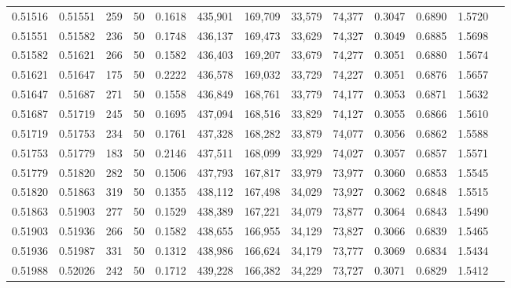 \begin{tabular}{rrrrrrrrrrrrr}
0.51516 & 0.51551 &   259 &  50 &                                     0.1618 & 435,901 & 169,709 &  33,579 &  74,377 & 0.3047 & 0.6890 & 1.5720 \\
0.51551 & 0.51582 &   236 &  50 &                                     0.1748 & 436,137 & 169,473 &  33,629 &  74,327 & 0.3049 & 0.6885 & 1.5698 \\
0.51582 & 0.51621 &   266 &  50 &                                     0.1582 & 436,403 & 169,207 &  33,679 &  74,277 & 0.3051 & 0.6880 & 1.5674 \\
0.51621 & 0.51647 &   175 &  50 &                                     0.2222 & 436,578 & 169,032 &  33,729 &  74,227 & 0.3051 & 0.6876 & 1.5657 \\
0.51647 & 0.51687 &   271 &  50 &                                     0.1558 & 436,849 & 168,761 &  33,779 &  74,177 & 0.3053 & 0.6871 & 1.5632 \\
0.51687 & 0.51719 &   245 &  50 &                                     0.1695 & 437,094 & 168,516 &  33,829 &  74,127 & 0.3055 & 0.6866 & 1.5610 \\
0.51719 & 0.51753 &   234 &  50 &                                     0.1761 & 437,328 & 168,282 &  33,879 &  74,077 & 0.3056 & 0.6862 & 1.5588 \\
0.51753 & 0.51779 &   183 &  50 &                                     0.2146 & 437,511 & 168,099 &  33,929 &  74,027 & 0.3057 & 0.6857 & 1.5571 \\
0.51779 & 0.51820 &   282 &  50 &                                     0.1506 & 437,793 & 167,817 &  33,979 &  73,977 & 0.3060 & 0.6853 & 1.5545 \\
0.51820 & 0.51863 &   319 &  50 &                                     0.1355 & 438,112 & 167,498 &  34,029 &  73,927 & 0.3062 & 0.6848 & 1.5515 \\
0.51863 & 0.51903 &   277 &  50 &                                     0.1529 & 438,389 & 167,221 &  34,079 &  73,877 & 0.3064 & 0.6843 & 1.5490 \\
0.51903 & 0.51936 &   266 &  50 &                                     0.1582 & 438,655 & 166,955 &  34,129 &  73,827 & 0.3066 & 0.6839 & 1.5465 \\
0.51936 & 0.51987 &   331 &  50 &                                     0.1312 & 438,986 & 166,624 &  34,179 &  73,777 & 0.3069 & 0.6834 & 1.5434 \\
0.51988 & 0.52026 &   242 &  50 &                                     0.1712 & 439,228 & 166,382 &  34,229 &  73,727 & 0.3071 & 0.6829 & 1.5412 \\

\end{tabular}

